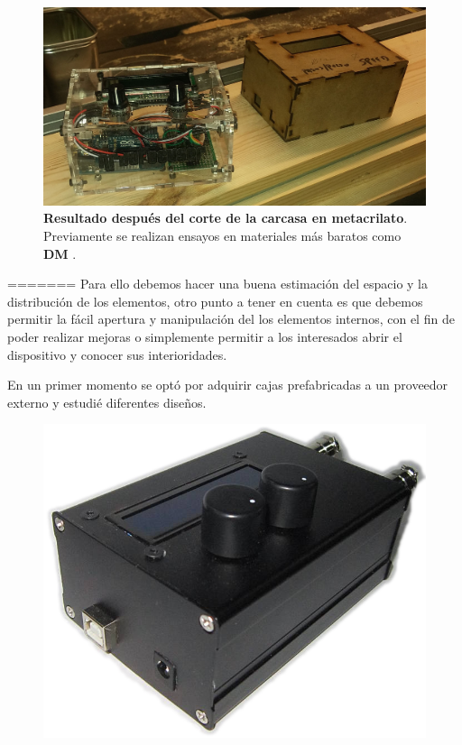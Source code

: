 \begin{figure}
	\centering
	\includegraphics[width=1\linewidth]{../images/cajas}
	\caption[Foto de la carcasa en metacrilato]{\textbf{Resultado después del corte de la carcasa en metacrilato}. Previamente se realizan ensayos en materiales más baratos como \textbf{DM} \cite{dm}.}
	\label{fig:cajaMetacrilato}
\end{figure}
=======
Para ello debemos hacer una buena estimación del espacio y la distribución de los elementos, otro punto a tener en cuenta es que debemos permitir la fácil apertura y manipulación del los elementos internos, con el fin de poder realizar mejoras o simplemente permitir a los interesados abrir el dispositivo y conocer sus interioridades. 

En un primer momento se optó por adquirir cajas prefabricadas a un proveedor externo y estudié diferentes diseños.

\begin{figure}
\centering
\includegraphics[width=0.7\linewidth]{../images/ardufocuser}
\caption{}
\label{fig:ardufocuser}
\end{figure}


